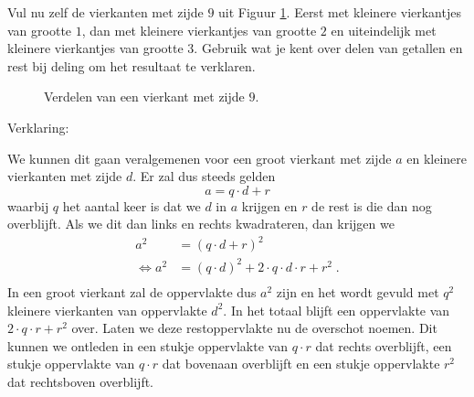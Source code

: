Vul nu zelf de vierkanten met zijde $9$ uit Figuur \ref{fig:vierkant9}. Eerst met kleinere vierkantjes van grootte $1$, dan met kleinere vierkantjes van grootte $2$ en uiteindelijk met kleinere vierkantjes van grootte $3$. Gebruik wat je kent over delen van getallen en rest bij deling om het resultaat te verklaren.

\begin{figure}[ht]
  \centering
  \caption{Verdelen van een vierkant met zijde $9$.}
  \label{fig:vierkant9}
\end{figure}

Verklaring:

We kunnen dit gaan veralgemenen voor een groot vierkant met zijde $a$ en kleinere vierkanten met zijde $d$. Er zal dus steeds gelden
$$
a = q\cdot d + r
$$
waarbij $q$ het aantal keer is dat we $d$ in $a$ krijgen en $r$ de rest is die dan nog overblijft. Als we dit dan links en rechts kwadrateren, dan krijgen we
\begin{align*}
  a^2  &= (q\cdot d + r)^2\\
  \Leftrightarrow a^2   &= (q\cdot d)^2 + 2\cdot q\cdot d\cdot r + r^2\;.\\
\end{align*}
In een groot vierkant zal de oppervlakte dus $a^2$ zijn en het wordt gevuld met $q^2$ kleinere vierkanten van oppervlakte $d^2$. In het totaal blijft een oppervlakte van $2\cdot q\cdot r + r^2$ over. Laten we deze restoppervlakte nu de overschot noemen. Dit kunnen we ontleden in een stukje oppervlakte van $q\cdot r$ dat rechts overblijft, een stukje oppervlakte van $q\cdot r$ dat bovenaan overblijft en een stukje oppervlakte $r^2$ dat rechtsboven overblijft.

